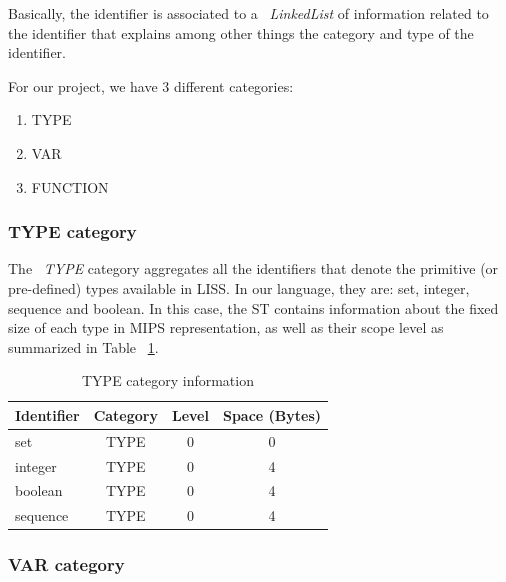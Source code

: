\documentclass[
  oneside,
  11pt, a4paper,
  footinclude=true,
  headinclude=true,
  cleardoublepage=empty
]{scrbook}
\begin{document}
Basically, the identifier is associated to a ~\textit{LinkedList} of information related to the identifier that explains among other things the category and type of the identifier.

For our project, we have 3 different categories:
\begin{enumerate}
\item TYPE
\item VAR
\item FUNCTION
\end{enumerate}

\subsubsection{TYPE category}

The ~\textit{TYPE} category aggregates all the identifiers that denote the primitive (or pre-defined) types available in LISS. In our language, they are: set, integer, sequence and boolean. 
In this case, the ST contains information about the fixed size of each type in MIPS representation, as well as their scope level as summarized in Table ~\ref{tbl:type_category_information}.

\begin{table}[h!]
\centering
\caption{TYPE category information}
\label{tbl:type_category_information}
\begin{tabular}{l|c|c|c}
\multicolumn{1}{c|}{Identifier} & \multicolumn{1}{l|}{Category} & \multicolumn{1}{l|}{Level} & \multicolumn{1}{l}{Space (Bytes)} \\ \hline
set                             & TYPE                          & 0                          & 0                                 \\ \hline
integer                         & TYPE                          & 0                          & 4                                 \\ \hline
boolean                         & TYPE                          & 0                          & 4                                 \\ \hline
sequence                        & TYPE                          & 0                          & 4                                
\end{tabular}
\end{table}

\subsubsection{VAR category}
\end{document}

